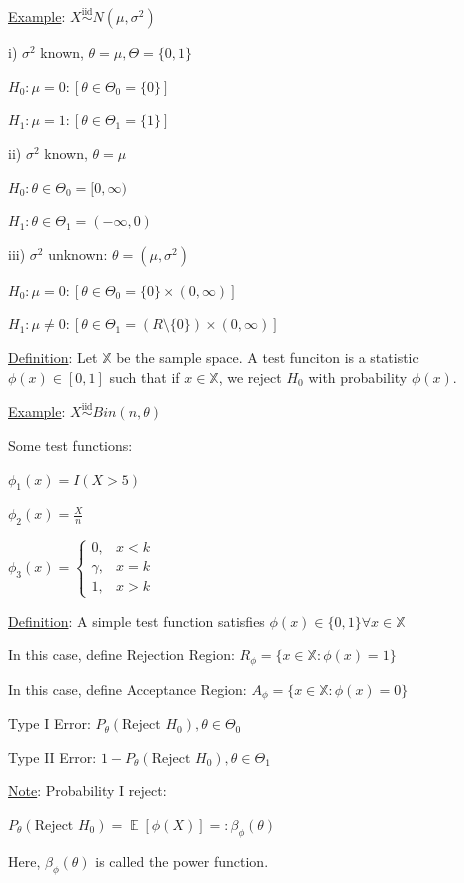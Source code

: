 \documentclass{article}
\DeclareMathOperator{\EX}{\mathbb{E}} %
\newcommand{\iiddist}{\overset{\mathrm{iid}}{\sim}}
\begin{document}
\underline{Example}: $X \iiddist N(\mu, \sigma^2)$

i) $\sigma^2$ known, $\theta = \mu, \Theta = \{0, 1\}$

$H_0: \mu = 0 : [\theta \in \Theta_0 = \{0\}]$

$H_1: \mu = 1 : [\theta \in \Theta_1 = \{1\}]$

ii) $\sigma^2$ known, $\theta = \mu$

$H_0: \theta \in \Theta_0 = [0, \infty)$

$H_1: \theta \in \Theta_1 = (-\infty, 0)$

iii) $\sigma^2$ unknown: $\theta = (\mu, \sigma^2)$

$H_0: \mu = 0 : [\theta \in \Theta_0 = \{0\} \times (0, \infty)]$

$H_1: \mu \neq 0 : [\theta \in \Theta_1 = (R \setminus \{0\}) \times (0, \infty)]$


\underline{Definition}: Let $\mathbb{X}$ be the sample space. A test funciton is a statistic $\phi(x) \in [0, 1]$ such that if $x \in \mathbb{X}$, we reject $H_0$ with probability $\phi(x)$.

\underline{Example}: $X \iiddist Bin(n, \theta)$

Some test functions:

$\phi_1(x) = I(X > 5)$

$\phi_2(x) = \frac{X}{n}$

$\phi_3(x) = \begin{cases} 0, & x < k \\ \gamma, & x = k \\ 1, & x > k \end{cases}$

\underline{Definition}: A simple test function satisfies $\phi(x) \in \{0, 1\} \forall x \in \mathbb{X}$

In this case, define Rejection Region: $R_{\phi} = \{x \in \mathbb{X}: \phi(x) = 1\}$

In this case, define Acceptance Region: $A_{\phi} = \{x \in \mathbb{X}: \phi(x) = 0\}$

Type I Error: $P_{\theta}(\text{Reject } H_0), \theta \in \Theta_0$

Type II Error: $1 - P_{\theta}(\text{Reject } H_0), \theta \in \Theta_1$

\underline{Note}: Probability I reject:

$P_{\theta}(\text{Reject } H_0) = \EX[\phi(X)] =: \beta_{\phi}(\theta)$

Here, $\beta_{\phi}(\theta)$ is called the power function.
\end{document}
